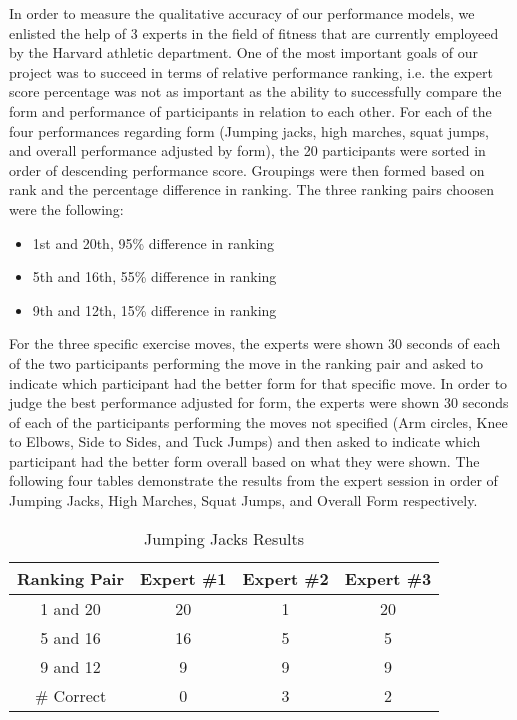 In order to measure the qualitative accuracy of our performance models, we enlisted the help of 3 experts in the field of fitness that are currently employeed by the Harvard athletic department.  One of the most important goals of our project was to succeed in terms of relative performance ranking, i.e. the expert score percentage was not as important as the ability to successfully compare the form and performance of participants in relation to each other.  For each of the four performances regarding form (Jumping jacks, high marches, squat jumps, and overall performance adjusted by form), the 20 participants were sorted in order of descending performance score.  Groupings were then formed based on rank and the percentage difference  in ranking.  The three ranking pairs choosen were the following: \\
\begin{itemize}
	\item{1st and 20th, 95\% difference in ranking} \\
	\item{5th and 16th, 55\% difference in ranking} \\
	\item{9th and 12th, 15\% difference in ranking} 
\end{itemize}
For the three specific exercise moves, the experts were shown 30 seconds of each of the two participants performing the move in the ranking pair and asked to indicate which participant had the better form for that specific move.  In order to judge the best performance adjusted for form, the experts were shown 30 seconds of each of the participants performing the moves not specified (Arm circles, Knee to Elbows, Side to Sides, and Tuck Jumps) and then asked to indicate which participant had the better form overall based on what they were shown.  The following four tables demonstrate the results from the expert session in order of Jumping Jacks, High Marches, Squat Jumps, and Overall Form respectively.\\

\begin{table}[h!]
\caption{Jumping Jacks Results}
\centering
\begin{tabular}{c c c c}
\hline \hline
Ranking Pair & Expert \#1 & Expert \#2 & Expert \#3 \\ [0.5ex]
\hline
1 and 20 &		20&		1&		20 \\
5 and 16 &		16&		5&		5 \\
9 and 12 &		9&		9&		9 \\
\hline
\# Correct&		0&		3&		2 \\
\end{tabular}
\label{table:jumpingjacksresult}
\end{table}

